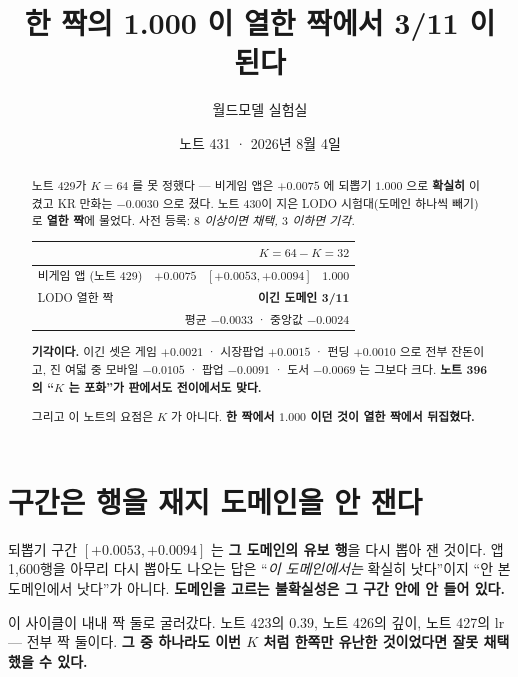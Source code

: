 \documentclass[11pt]{article}
\begin{document}
\title{한 짝의 1.000 이 열한 짝에서 3/11 이 된다}
\author{월드모델 실험실}
\date{노트 431 · 2026년 8월 4일}
\maketitle

\begin{abstract}
노트 429가 $K{=}64$ 를 못 정했다 --- 비게임 앱은 $+0.0075$ 에 되뽑기
$1.000$ 으로 \textbf{확실히} 이겼고 KR 만화는 $-0.0030$ 으로 졌다.
노트 430이 지은 LODO 시험대(도메인 하나씩 빼기)로 \textbf{열한 짝}에
물었다. 사전 등록: \emph{$8$ 이상이면 채택, $3$ 이하면 기각.}

\begin{center}
\begin{tabular}{lr}
\hline
 & $K{=}64 - K{=}32$ \\
\hline
비게임 앱 (노트 429) & $\mathbf{+0.0075}$ \ $[+0.0053, +0.0094]$ \ $\mathbf{1.000}$ \\
\hline
LODO 열한 짝 & \textbf{이긴 도메인 3/11} \\
 & 평균 $-0.0033$ · 중앙값 $-0.0024$ \\
\hline
\end{tabular}
\end{center}

\textbf{기각이다.} 이긴 셋은 게임 $+0.0021$ · 시장팝업 $+0.0015$ · 펀딩
$+0.0010$ 으로 전부 잔돈이고, 진 여덟 중 모바일 $-0.0105$ · 팝업 $-0.0091$ ·
도서 $-0.0069$ 는 그보다 크다. \textbf{노트 396의 ``$K$ 는 포화''가 판에서도
전이에서도 맞다.}

그리고 이 노트의 요점은 $K$ 가 아니다. \textbf{한 짝에서 $1.000$ 이던 것이
열한 짝에서 뒤집혔다.}
\end{abstract}

\section{구간은 행을 재지 도메인을 안 잰다}

되뽑기 구간 $[+0.0053, +0.0094]$ 는 \textbf{그 도메인의 유보 행}을 다시
뽑아 잰 것이다. 앱 1{,}600행을 아무리 다시 뽑아도 나오는 답은
``\emph{이 도메인에서는} 확실히 낫다''이지 ``안 본 도메인에서 낫다''가
아니다. \textbf{도메인을 고르는 불확실성은 그 구간 안에 안 들어 있다.}

이 사이클이 내내 짝 둘로 굴러갔다. 노트 423의 $0.39$, 노트 426의 깊이,
노트 427의 lr --- 전부 짝 둘이다. \textbf{그 중 하나라도 이번 $K$ 처럼
한쪽만 유난한 것이었다면 잘못 채택했을 수 있다.}
\end{document}
